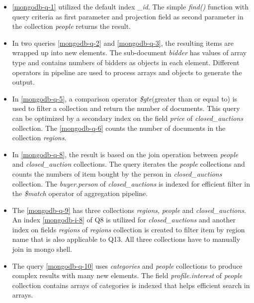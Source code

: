 \begin{itemize}
\item \ref{mongodb-q-1} utilized the default index \textit{\_id}. The simple \textit{find()} function with  query criteria as first parameter and projection field  as second parameter in the collection \textit{people} returns the result.

\item In two queries \ref{mongodb-q-2} and \ref{mongodb-q-3},  the resulting items are wrapped up into new elements.  The sub-document \textit{bidder} has values of array type and contains numbers of bidders as objects in each element. Different operators in pipeline are used to process  arrays and objects to generate the output.

\item In \ref{mongodb-q-5}, a comparison operator \textit{\$gte}(greater than or equal to) is used to filter a collection and return the number of documents. This query can be optimized by a secondary index on the field \textit{price} of \textit{closed\_auctions} collection.  The \ref{mongodb-q-6} counts the number of documents in the collection \textit{regions}.

\item In \ref{mongodb-q-8}, the result is based on the join operation  between  \textit{people} and \textit{closed\_auction} collections.
The query iterates the \textit{people}  collections and counts the numbers of item bought by the person in \textit{closed\_auctions} collection.
The \textit{buyer.person} of \textit{closed\_auctions} is indexed for efficient filter in the \textit{\$match} operator of aggregation pipeline.   

 \item 
The  \ref{mongodb-q-9} has three collections \textit{regions}, \textit{people} and \textit{closed\_auctions}.  An index \ref{mongodb-i-8} of Q8 is utilized for \textit{closed\_auctions} and another index on fields \textit{regions} of \textit{regions} collection is created to filter item by region name that is also applicable to Q13. All three collections have to manually join in mongo shell.

\item The query \ref{mongodb-q-10} uses  \textit{categories} and \textit{people} collections to produce complex results with many new elements. The field \textit{profile.interest} of \textit{people} collection contains  arrays of categories is indexed that helps efficient search in arrays. 


\end{itemize}
